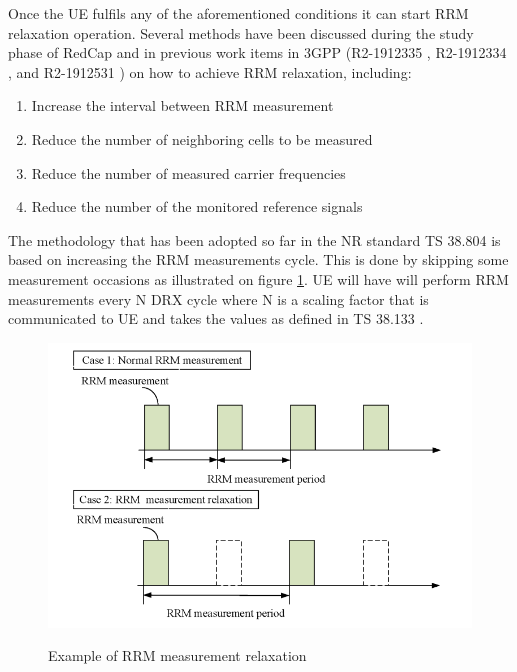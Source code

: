 \documentclass[conference]{IEEEtran}
\begin{document}
Once the UE fulfils any of the aforementioned conditions it can start RRM relaxation operation. Several methods have been discussed during the study phase of RedCap and in previous work items in 3GPP (R2-1912335 \cite{3gpp_ue_2019_R2-1912335}, R2-1912334 \cite{3gpp_rrm_2019_R2-1912334}, and R2-1912531 \cite{1912531_R2-1912531}) on how to achieve RRM relaxation, including:
\begin{enumerate}
    \item Increase the interval between RRM measurement
    \item Reduce the number of neighboring cells to be measured
    \item Reduce the number of measured carrier frequencies
    \item Reduce the number of the monitored reference signals
\end{enumerate}
The methodology that has been adopted so far in the NR standard TS 38.804 \cite{3gpp.38.304} is based on increasing the RRM measurements cycle. This is done by skipping some measurement occasions as illustrated on figure \ref{fig:rrm-relaxation}. UE will have will perform RRM measurements every N DRX cycle where N is a scaling factor that is communicated to UE and takes the values as defined in TS 38.133 \cite{3gpp.38.133}.

\begin{figure}
    \centering
    \includegraphics[width=\linewidth]{Pictures/RRM measurement relaxation.png}
    \label{fig:rrm-relaxation}
    \caption{Example of RRM measurement relaxation}
\end{figure}
\end{document}
